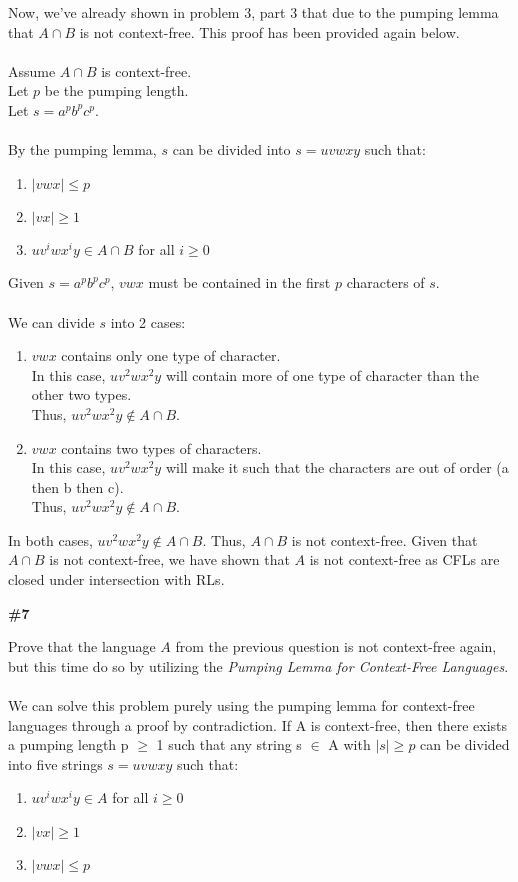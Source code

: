 \documentclass{article}
\newcommand{\problem}[1]{\textbf{\##1}}
\begin{document}
Now, we've already shown in problem 3, part 3 that due to the pumping lemma that $A \cap B$ is not context-free. This proof has been provided again below.\\
\\
Assume $A \cap B$ is context-free.\\
Let $p$ be the pumping length.\\
Let $s = a^pb^pc^p$.\\
\\
By the pumping lemma, $s$ can be divided into $s = uvwxy$ such that:
\begin{enumerate}
    \item $|vwx| \leq p$
    \item $|vx| \geq 1$
    \item $uv^iwx^iy \in A \cap B$ for all $i \geq 0$
\end{enumerate}

Given $s = a^pb^pc^p$, $vwx$ must be contained in the first $p$ characters of $s$.\\
\\
We can divide $s$ into 2 cases:

\begin{enumerate}
    \item $vwx$ contains only one type of character.\\
    In this case, $uv^2wx^2y$ will contain more of one type of character than the other two types.\\
    Thus, $uv^2wx^2y \notin A \cap B$.
    \item $vwx$ contains two types of characters.\\
    In this case, $uv^2wx^2y$ will make it such that the characters are out of order (a then b then c).\\
    Thus, $uv^2wx^2y \notin A \cap B$.
\end{enumerate}

In both cases, $uv^2wx^2y \notin A \cap B$. Thus, $A \cap B$ is not context-free. Given that $A \cap B$ is not context-free, we have shown that $A$ is not context-free as CFLs are closed under intersection with RLs.

\pagebreak

\problem{7}

Prove that the language $A$ from the previous question is not context-free again, but this time do so by utilizing the \emph{Pumping Lemma for Context-Free Languages}.\\
\\
We can solve this problem purely using the pumping lemma for context-free languages through a proof by contradiction. If A is context-free, then there exists a pumping length p $\geq$ 1 such that any string s $\in$ A with $|s| \geq p$ can be divided into five strings $s = uvwxy$ such that:
\begin{enumerate}
    \item $uv^iwx^iy \in A$ for all $i \geq 0$
    \item $|vx| \geq 1$
    \item $|vwx| \leq p$
\end{enumerate}
\end{document}
